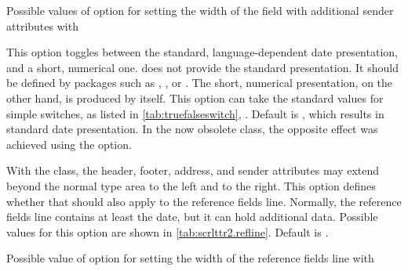 \begin{table}
  \caption[{Possible values of option  with
    }]{Possible values of option  for setting
    the width of the field with additional sender attributes with
    }
  \label{tab:scrlttr2.locfield}
  \begin{desctabular}
  \end{desctabular}
\end{table}
%
%


\begin{Declaration}
\end{Declaration}
%
This option toggles between the standard, language-dependent date
presentation, and a short, numerical one. {\KOMAScript} does not
provide the standard presentation. It should be defined by packages
such as ,
, or
. The short, numerical
presentation, on the other hand, is produced by 
itself. This option can take the standard values for simple switches,
as listed in \autoref{tab:truefalseswitch},
. Default is
, which results in standard date presentation. In the
now obsolete  class, the opposite effect was achieved
using the  option.
%
%

\begin{Declaration}
\end{Declaration}
%
With the  class, the header, footer, address, and
sender attributes may extend beyond the normal type area to the left
and to the right. This option defines whether that should also apply
to the reference fields line. Normally, the reference fields line
contains at least the date, but it can hold additional data. Possible
values for this option are shown in
\autoref{tab:scrlttr2.refline}. Default is .

\begin{table}
  \caption[{Possible value of option  with
    }]{Possible value of option  for setting
    the width of the reference fields line with
    }
  \label{tab:scrlttr2.refline}
  \begin{desctabular}
  \end{desctabular}
\end{table}
%
%

